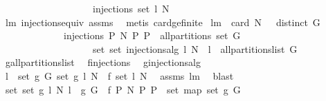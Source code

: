 \begin{isabellebody}
\ \ \ \ \ \ \ \ \ \ \ \ \ \ \ \ \ \ \ injections\ {\isacharparenleft}set\ l{\isacharparenright}\ N{\isachardoublequoteclose}\isanewline
%
\isadelimproof
\ \ \ \ \ \ \ \ \ \ \ \ %
\endisadelimproof
%
\isatagproof
{}\isamarkupfalse%
\ lm{}{}\ injections{\isacharunderscore}equiv\ assms\ \isamarkupfalse%
\ {\isacharparenleft}metis\ card{\isacharunderscore}ge{\isacharunderscore}{}{\isacharunderscore}finite{\isacharparenright}%
\endisatagproof
{\isafoldproof}%
%
\isadelimproof
\isanewline
%
\endisadelimproof
\isanewline
\isanewline
{}\isamarkupfalse%
\ lm{}{}{\isacharcolon}\ \ {\isachardoublequoteopen}card\ N\ {\isachargreater}\ {}{\isachardoublequoteclose}\ {\isachardoublequoteopen}distinct\ G{\isachardoublequoteclose}\isanewline
\ \ \ \ \ \ \ \ \ \ \ \ \ {\isachardoublequoteopen}{\isacharbraceleft}injections\ P\ N{\isacharbar}\ P{\isachardot}\ P\ {\isasymin}\ all{\isacharunderscore}partitions\ {\isacharparenleft}set\ G{\isacharparenright}{\isacharbraceright}\ {\isacharequal}\isanewline
\ \ \ \ \ \ \ \ \ \ \ \ \ \ \ \ \ \ \ set\ {\isacharbrackleft}set\ {\isacharparenleft}injections{\isacharunderscore}alg\ l\ N{\isacharparenright}\ {\isachardot}\ l\ {\isasymleftarrow}\ all{\isacharunderscore}partitions{\isacharunderscore}list\ G{\isacharbrackright}{\isachardoublequoteclose}\ \isanewline
%
\isadelimproof
%
\endisadelimproof
%
\isatagproof
{}\isamarkupfalse%
\ {\isacharminus}\isanewline
\ \ \isamarkupfalse%
\ {\isacharquery}g{}{\isacharequal}all{\isacharunderscore}partitions{\isacharunderscore}list\ \isamarkupfalse%
\ {\isacharquery}f{}{\isacharequal}injections\ \isamarkupfalse%
\ {\isacharquery}g{}{\isacharequal}injections{\isacharunderscore}alg\isanewline
\ \ \isamarkupfalse%
\ {\isachardoublequoteopen}{\isasymforall}l\ {\isasymin}\ set\ {\isacharparenleft}{\isacharquery}g{}\ G{\isacharparenright}{\isachardot}\ set\ {\isacharparenleft}{\isacharquery}g{}\ l\ N{\isacharparenright}\ {\isacharequal}\ {\isacharquery}f{}\ {\isacharparenleft}set\ l{\isacharparenright}\ N{\isachardoublequoteclose}\ \isamarkupfalse%
\ assms\ lm{}{}\ \isamarkupfalse%
\ blast\isanewline
\ \ \isamarkupfalse%
\ \isamarkupfalse%
\ {\isachardoublequoteopen}set\ {\isacharbrackleft}set\ {\isacharparenleft}{\isacharquery}g{}\ l\ N{\isacharparenright}{\isachardot}\ l\ {\isacharless}{\isacharminus}\ {\isacharquery}g{}\ G{\isacharbrackright}\ {\isacharequal}\ {\isacharbraceleft}{\isacharquery}f{}\ P\ N{\isacharbar}\ P{\isachardot}\ P\ {\isasymin}\ set\ {\isacharparenleft}map\ set\ {\isacharparenleft}{\isacharquery}g{}\ G{\isacharparenright}{\isacharparenright}{\isacharbraceright}{\isachardoublequoteclose}\ \isamarkupfalse%

\end{isabellebody}
